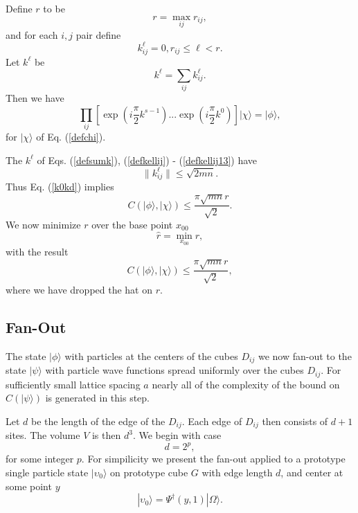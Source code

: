 \documentclass[twocolumn,amsmath,amssymb]{revtex4-1}
\begin{document}
Define $r$ to be
\begin{equation}
  \label{defs}
  r = \max_{ij} r_{ij},
\end{equation}
and for each $i, j$ pair define
\begin{equation}
  \label{extendk}
  k ^\ell_{ij} = 0, r_{ij} \le \ell < r.
\end{equation}
Let $k^\ell$ be
\begin{equation}
  \label{defsumk}
  k^\ell = \sum_{ij} k^\ell_{ij}.
\end{equation}
Then we have
\begin{equation}
\label{k0kd}
\prod_{ij}[ \exp( i\frac{\pi}{2} k^{s-1}) ... \exp( i\frac{\pi}{2} k^0)] |\chi \rangle  = |\phi \rangle ,
\end{equation}
for $|\chi \rangle $ of Eq. (\ref{defchi}).


The $k^\ell$ of Eqs. (\ref{defsumk}), (\ref{defkellij}) - (\ref{defkellij13}) have
\begin{equation}
\label{normk0kd}
\parallel k^\ell_{ij} \parallel \le  \sqrt{2 mn}.
\end{equation}
Thus  Eq. (\ref{k0kd}) implies
\begin{equation}
\label{deltac0}
C( |\phi \rangle , |\chi \rangle ) \le \frac{ \pi \sqrt{mn} r}{\sqrt{2}} .
\end{equation}
We now minimize $r$ over the base point $x_{00}$ 
\begin{equation}
  \label{defdd}
  \hat{r} = \min_{x_{00}} r,
\end{equation}
with the result
\begin{equation}
\label{deltac1}
C( |\phi \rangle , |\chi \rangle ) \le \frac{ \pi \sqrt{mn} r}{\sqrt{2}},
\end{equation}
where we have dropped the hat on $r$.

\subsection{\label{app:fanout}Fan-Out}

The state $|\phi \rangle $ with particles at the centers of the cubes $D_{ij}$ we now fan-out
to the state $|\psi \rangle $ with particle wave functions spread uniformly over the
cubes $D_{ij}$. For sufficiently small lattice spacing $a$ nearly all of the complexity of
the bound on $C(|\psi \rangle )$ is generated in this step.

Let $d$ be the length of the edge of the $D_{ij}$. Each edge of
$D_{ij}$ then consists of $d+1$ sites. The volume $V$ is then $d^3$. We begin with case
\begin{equation}
\label{rpower2}
d = 2^p,  
\end{equation}
for some integer $p$. For simpilicity we present the fan-out applied to
a prototype single particle state $|\upsilon_0 \rangle $ on prototype cube $G$ with edge length $d$,
and center at some point $y$
\begin{equation}
\label{defupsilon0}
|\upsilon_0 \rangle  =  \Psi^{\dagger}( y, 1) |\Omega \rangle .
\end{equation}
\end{document}
